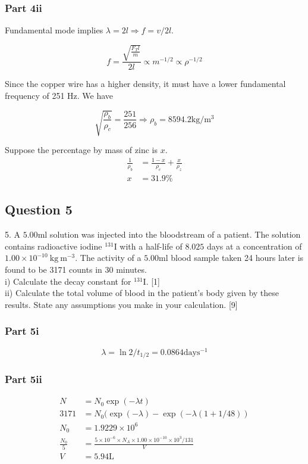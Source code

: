 \documentclass{article}
\begin{document}
\subsubsection{Part 4ii}
Fundamental mode implies $\lambda = 2l \Rightarrow f=v/2l$.

\[f = \frac{\sqrt{\frac{F_T l}{m}}}{2l} \propto m^{-1/2} \propto \rho^{-1/2}\]

Since the copper wire has a higher density, it must have a lower fundamental frequency of 251 Hz. We have

\[\sqrt{\frac{\rho_b}{\rho_c}} = \frac{251}{256} \Rightarrow \rho_b = 8594.2 \mathrm{kg/m^3}\]

Suppose the percentage by mass of zinc is $x$. 
\begin{align}
    \frac{1}{\rho_b} &= \frac{1-x}{\rho_c} + \frac{x}{\rho_z} \\
    x &= 31.9 \%
\end{align}
\subsection{Question 5}
5. A $5.00 \mathrm{ml}$ solution was injected into the bloodstream of a patient. The solution contains radioactive iodine ${ }^{131} \mathrm{I}$ with a half-life of $8.025$ days at a concentration of $1.00 \times 10^{-10} \mathrm{~kg} \mathrm{~m}^{-3}$. The activity of a $5.00 \mathrm{ml}$ blood sample taken 24 hours later is found to be 3171 counts in 30 minutes. \\
i) Calculate the decay constant for ${ }^{131} \mathrm{I}$. [1]\\
ii) Calculate the total volume of blood in the patient's body given by these results. State any assumptions you make in your calculation. [9]

\subsubsection{Part 5i}
\[\lambda = \ln 2 / t_{1/2} = 0.0864 \mathrm{days^{-1}}\]

\subsubsection{Part 5ii}
\begin{align}
    N &= N_0 \exp(-\lambda t) \\
    3171 &= N_0 (\exp(-\lambda) - \exp(-\lambda(1+1/48)) \\
    N_0 &= 1.9229 \times 10^6 \\
    \frac{N_0}{5} &= \frac{5\times 10^{-6} \times N_A \times 1.00 \times 10^{-10} \times 10^3/ 131}{V} \\
    V &= 5.94 \mathrm{L}
\end{align}
\end{document}
